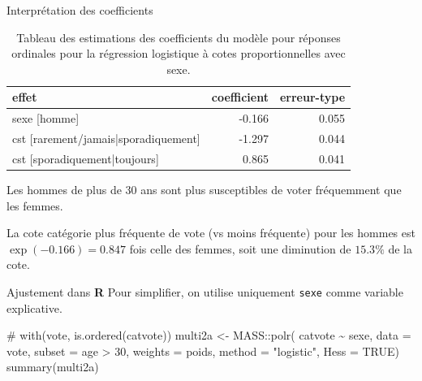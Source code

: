 \documentclass[
  ignorenonframetext,
]{beamer}
\newenvironment{Shaded}{\begin{snugshade}}{\end{snugshade}}
\newcommand{\AttributeTok}[1]{\textcolor[rgb]{0.40,0.45,0.13}{#1}}
\newcommand{\CommentTok}[1]{\textcolor[rgb]{0.37,0.37,0.37}{#1}}
\newcommand{\ConstantTok}[1]{\textcolor[rgb]{0.56,0.35,0.01}{#1}}
\newcommand{\DecValTok}[1]{\textcolor[rgb]{0.68,0.00,0.00}{#1}}
\newcommand{\FunctionTok}[1]{\textcolor[rgb]{0.28,0.35,0.67}{#1}}
\newcommand{\NormalTok}[1]{\textcolor[rgb]{0.00,0.23,0.31}{#1}}
\newcommand{\OtherTok}[1]{\textcolor[rgb]{0.00,0.23,0.31}{#1}}
\newcommand{\SpecialCharTok}[1]{\textcolor[rgb]{0.37,0.37,0.37}{#1}}
\newcommand{\StringTok}[1]{\textcolor[rgb]{0.13,0.47,0.30}{#1}}
\begin{document}
\begin{frame}{Interprétation des coefficients}
\protect\hypertarget{interpruxe9tation-des-coefficients}{}
\hypertarget{tbl-ordered-logistic}{}
\begin{table}
\caption{\label{tbl-ordered-logistic}Tableau des estimations des coefficients du modèle pour réponses
ordinales pour la régression logistique à cotes proportionnelles avec
sexe. }\tabularnewline

\centering
\begin{tabular}[t]{lrr}
\toprule
effet & coefficient & erreur-type\\
\midrule
sexe [homme] & -0.166 & 0.055\\
cst [rarement/jamais|sporadiquement] & -1.297 & 0.044\\
cst [sporadiquement|toujours] & 0.865 & 0.041\\
\bottomrule
\end{tabular}
\end{table}

Les hommes de plus de 30 ans sont plus susceptibles de voter fréquemment
que les femmes.

La cote catégorie plus fréquente de vote (vs moins fréquente) pour les
hommes est \(\exp(-0.166)=0.847\) fois celle des femmes, soit une
diminution de \(15.3\%\) de la cote.
\end{frame}

\begin{frame}[fragile]{Ajustement dans \textbf{R}}
\protect\hypertarget{ajustement-dans-r}{}
Pour simplifier, on utilise uniquement \texttt{sexe} comme variable
explicative.

\begin{Shaded}
\begin{Highlighting}[numbers=left,,]
\CommentTok{\# with(vote, is.ordered(catvote))}
\NormalTok{multi2a }\OtherTok{\textless{}{-}}\NormalTok{ MASS}\SpecialCharTok{::}\FunctionTok{polr}\NormalTok{(}
\NormalTok{  catvote }\SpecialCharTok{\textasciitilde{}}\NormalTok{ sexe, }
  \AttributeTok{data =}\NormalTok{ vote, }
  \AttributeTok{subset =}\NormalTok{ age }\SpecialCharTok{\textgreater{}} \DecValTok{30}\NormalTok{,}
  \AttributeTok{weights =}\NormalTok{ poids,}
  \AttributeTok{method =} \StringTok{"logistic"}\NormalTok{, }
  \AttributeTok{Hess =} \ConstantTok{TRUE}\NormalTok{)}
\FunctionTok{summary}\NormalTok{(multi2a)}
\end{Highlighting}
\end{Shaded}
\end{frame}
\end{document}
